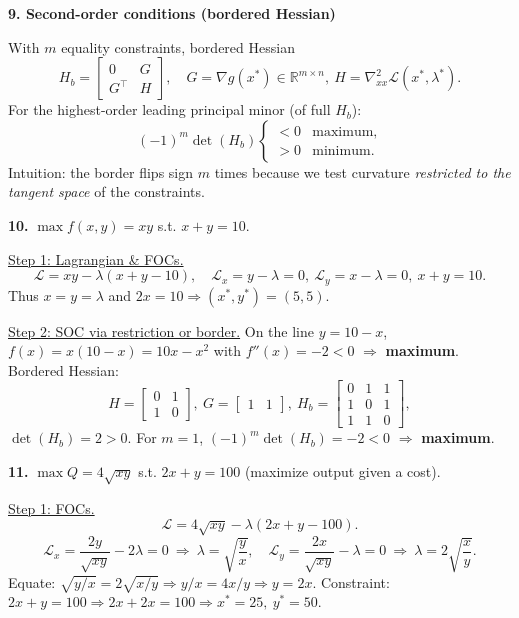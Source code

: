 \documentclass[12pt]{article}
\begin{document}
\textbf{9. Second-order conditions (bordered Hessian)}

With $m$ equality constraints, bordered Hessian
\[
H_b=\begin{bmatrix}
0 & G\\
G^\top & H
\end{bmatrix},\quad 
G=\nabla g(x^\ast)\in\mathbb{R}^{m\times n},\ H=\nabla_{xx}^2\mathcal{L}(x^\ast,\lambda^\ast).
\]
For the highest-order leading principal minor (of full $H_b$):
\[
(-1)^m\det(H_b)\begin{cases}
<0 & \text{maximum},\\
>0 & \text{minimum}.
\end{cases}
\]
Intuition: the border flips sign $m$ times because we test curvature \emph{restricted to the tangent space} of the constraints.

\medskip

\textbf{10.} $\max f(x,y)=xy$ s.t. $x+y=10$.

\underline{Step 1: Lagrangian \& FOCs.}
\[
\mathcal{L}=xy-\lambda(x+y-10),\quad
\mathcal{L}_x=y-\lambda=0,\ \mathcal{L}_y=x-\lambda=0,\ x+y=10.
\]
Thus $x=y=\lambda$ and $2x=10\Rightarrow (x^\ast,y^\ast)=(5,5)$.

\underline{Step 2: SOC via restriction or border.}
On the line $y=10-x$, $f(x)=x(10-x)=10x-x^2$ with $f''(x)=-2<0$ $\Rightarrow$ \textbf{maximum}.\\
Bordered Hessian:
\[
H=\begin{bmatrix}0&1\\1&0\end{bmatrix},\ 
G=\begin{bmatrix}1&1\end{bmatrix},\ 
H_b=\begin{bmatrix}
0&1&1\\
1&0&1\\
1&1&0
\end{bmatrix},
\]
$\det(H_b)=2>0$. For $m=1$, $(-1)^m\det(H_b)=-2<0$ $\Rightarrow$ \textbf{maximum}.

\medskip

\textbf{11.} $\max Q=4\sqrt{xy}$ s.t. $2x+y=100$ (maximize output given a cost).

\underline{Step 1: FOCs.}
\[
\mathcal{L}=4\sqrt{xy}-\lambda(2x+y-100).
\]
\[
\mathcal{L}_x=\frac{2y}{\sqrt{xy}}-2\lambda=0\ \Rightarrow\ \lambda=\sqrt{\frac{y}{x}},
\quad
\mathcal{L}_y=\frac{2x}{\sqrt{xy}}-\lambda=0\ \Rightarrow\ \lambda=2\sqrt{\frac{x}{y}}.
\]
Equate: $\sqrt{y/x}=2\sqrt{x/y}\Rightarrow y/x=4x/y\Rightarrow y=2x$.
Constraint: $2x+y=100\Rightarrow 2x+2x=100\Rightarrow x^\ast=25,\ y^\ast=50$.
\end{document}
